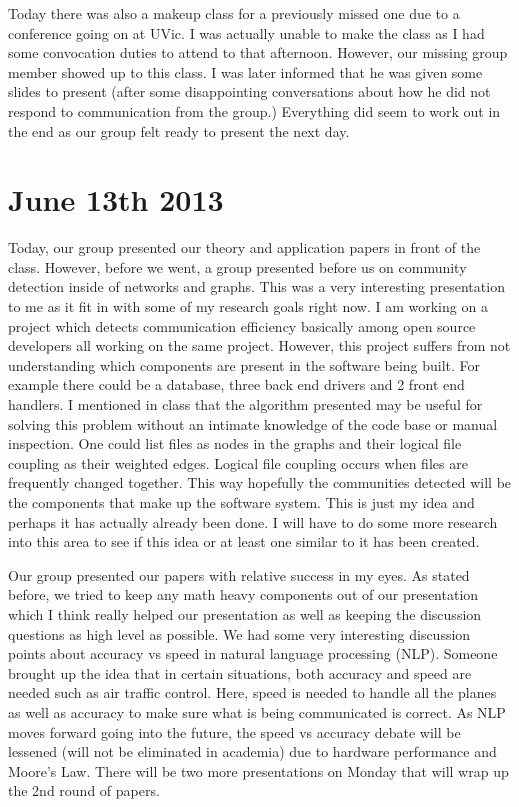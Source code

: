 \documentclass[conference]{IEEEtran}
\begin{document}
Today there was also a makeup class for a previously missed one due to a conference going on
at UVic. I was actually unable to make the class as I had some convocation duties to attend to that
afternoon. However, our missing group member showed up to this class. I was later informed that 
he was given some slides to present (after some disappointing conversations about how he did not
respond to communication from the group.) Everything did seem to work out in the end as our group
felt ready to present the next day.

\section{June 13th 2013}
Today, our group presented our theory and application papers in front of the class. However, before
we went, a group presented before us on community detection inside of networks and graphs. This
was a very interesting presentation to me as it fit in with some of my research goals right now. I
am working on a project which detects communication efficiency basically among open source developers
all working on the same project. However, this project suffers from not understanding which components
are present in the software being built. For example there could be a database, three back end drivers
and 2 front end handlers. I mentioned in class that the algorithm presented may be useful for solving 
this problem without an intimate knowledge of the code base or manual inspection. One could list files
as nodes in the graphs and their logical file coupling as their weighted edges. Logical file coupling 
occurs when files are frequently changed together. This way hopefully the communities detected will
be the components that make up the software system. This is just my idea and perhaps it has actually
already been done. I will have to do some more research into this area to see if this idea or at least
one similar to it has been created.

Our group presented our papers with relative success in my eyes. As stated before, we tried to keep
any math heavy components out of our presentation which I think really helped our presentation as well
as keeping the discussion questions as high level as possible. We had some very interesting discussion
points about accuracy vs speed in natural language processing (NLP). Someone brought up the idea that 
in certain situations, both accuracy and speed are needed such as air traffic control. Here, speed is needed
to handle all the planes as well as accuracy to make sure what is being communicated is correct. As
NLP moves forward going into the future, the speed vs accuracy debate will be lessened (will not be 
eliminated in academia) due to hardware performance and Moore's Law. There will be two more presentations
on Monday that will wrap up the 2nd round of papers.
\end{document}
